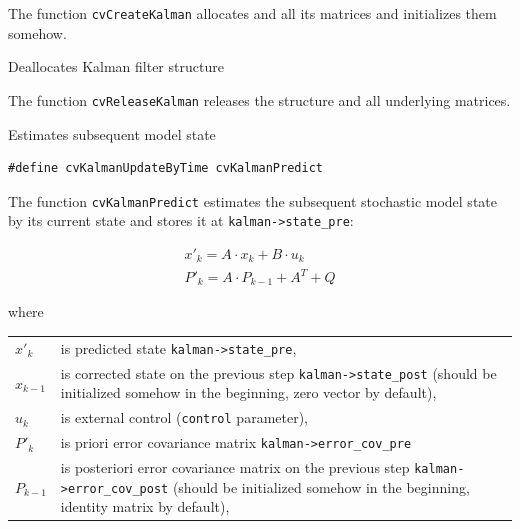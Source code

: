 The function \texttt{cvCreateKalman} allocates  and all its matrices and initializes them somehow.

\label{ReleaseKalman}

Deallocates Kalman filter structure


\begin{description}
\end{description}

The function \texttt{cvReleaseKalman} releases the structure  and all underlying matrices.

\label{KalmanPredict}

Estimates subsequent model state

\begin{lstlisting}
#define cvKalmanUpdateByTime cvKalmanPredict
\end{lstlisting}

\begin{description}
\end{description}

The function \texttt{cvKalmanPredict} estimates the subsequent stochastic model state by its current state and stores it at \texttt{kalman->state\_pre}:

\[
\begin{array}{l}
x'_k=A \cdot x_k+B \cdot u_k\\
P'_k=A \cdot P_{k-1}+A^T + Q
\end{array}
\]

where

\begin{tabular}{l p{5 in}}
$x'_k$ & is predicted state \texttt{kalman->state\_pre},\\
$x_{k-1}$ & is corrected state on the previous step \texttt{kalman->state\_post}
                (should be initialized somehow in the beginning, zero vector by default),\\
$u_k$ & is external control (\texttt{control} parameter),\\
$P'_k$ & is priori error covariance matrix \texttt{kalman->error\_cov\_pre}\\
$P_{k-1}$ & is posteriori error covariance matrix on the previous step \texttt{kalman->error\_cov\_post}
                (should be initialized somehow in the beginning, identity matrix by default),
\end{tabular}

